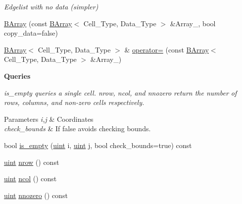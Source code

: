 \begin{Indent}
\begin{DoxyCompactItemize}
\begin{DoxyCompactList}\small\item\em Edgelist with no data (simpler) \end{DoxyCompactList}\item 
\hyperlink{class_b_array_a1e4a2a12c3a57e462ee4d65d7842a1c7}{B\+Array} (const \hyperlink{class_b_array}{B\+Array}$<$ Cell\+\_\+\+Type, Data\+\_\+\+Type $>$ \&Array\+\_\+, bool copy\+\_\+data=false)
\item 
\hyperlink{class_b_array}{B\+Array}$<$ Cell\+\_\+\+Type, Data\+\_\+\+Type $>$ \& \hyperlink{class_b_array_aa6dba52877c92fa8eafc35faa5f7f304}{operator=} (const \hyperlink{class_b_array}{B\+Array}$<$ Cell\+\_\+\+Type, Data\+\_\+\+Type $>$ \&Array\+\_\+)
\end{DoxyCompactItemize}
\end{Indent}
\begin{Indent}\textbf{ Queries}\par
{\em {\ttfamily is\+\_\+empty} queries a single cell. {\ttfamily nrow}, {\ttfamily ncol}, and {\ttfamily nnozero} return the number of rows, columns, and non-\/zero cells respectively. 
\begin{DoxyParams}{Parameters}
{\em i,j} & Coordinates \\
\hline
{\em check\+\_\+bounds} & If {\ttfamily false} avoids checking bounds. \\
\hline
\end{DoxyParams}
}\begin{DoxyCompactItemize}
\item 
bool \hyperlink{class_b_array_a37ed3962c0ee5030b23cb6cde23a5cdf}{is\+\_\+empty} (\hyperlink{typedefs_8hpp_a91ad9478d81a7aaf2593e8d9c3d06a14}{uint} i, \hyperlink{typedefs_8hpp_a91ad9478d81a7aaf2593e8d9c3d06a14}{uint} j, bool check\+\_\+bounds=true) const
\item 
\hyperlink{typedefs_8hpp_a91ad9478d81a7aaf2593e8d9c3d06a14}{uint} \hyperlink{class_b_array_ac829edf4a9921bd6b3f56afbcbb2f37f}{nrow} () const
\item 
\hyperlink{typedefs_8hpp_a91ad9478d81a7aaf2593e8d9c3d06a14}{uint} \hyperlink{class_b_array_ac669bd57e3cbf4c60bf2b4a459dcdc4f}{ncol} () const
\item 
\hyperlink{typedefs_8hpp_a91ad9478d81a7aaf2593e8d9c3d06a14}{uint} \hyperlink{class_b_array_a9910b6f42e37d3b0a12cafb70b78775f}{nnozero} () const
\end{DoxyCompactItemize}
\end{Indent}
